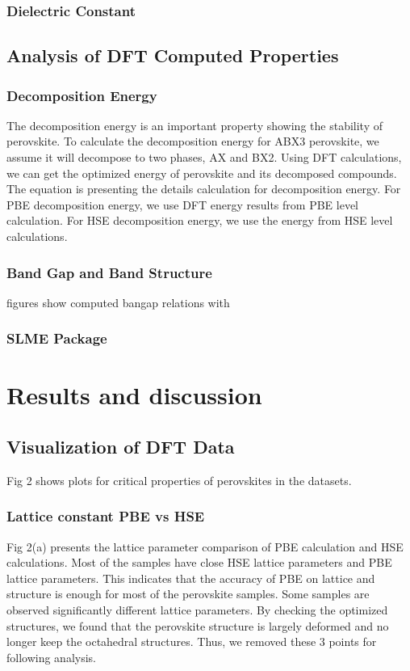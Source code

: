 \documentclass[twoside,twocolumn,9pt]{article}
\begin{document}
    \subsubsection*{Dielectric Constant }

    \subsection*{Analysis of DFT Computed Properties}
    \subsubsection*{Decomposition Energy}
    The decomposition energy is an important property showing the
    stability of perovskite. To calculate the decomposition energy for
    ABX3 perovskite, we assume it will decompose to two phases, AX and
    BX2. Using DFT calculations, we can get the optimized energy of
    perovskite and its decomposed compounds.
    The equation is presenting the details calculation for decomposition
    energy. For PBE decomposition energy, we use DFT energy results from
    PBE level calculation. For HSE decomposition energy, we use the energy
    from HSE level calculations.

    \subsubsection*{Band Gap and Band Structure}
    figures show computed bangap relations with 

    \subsubsection*{SLME Package}

    \newpage




    \section*{Results and discussion}

    \subsection*{Visualization of DFT Data}

    Fig 2 shows plots for critical properties of perovskites in the datasets.

    \subsubsection*{Lattice constant PBE vs HSE}
    Fig 2(a) presents the lattice parameter comparison of PBE calculation
    and HSE calculations. Most of the samples have close HSE lattice
    parameters and PBE lattice parameters. This indicates that the
    accuracy of PBE on lattice and structure is enough for most of the
    perovskite samples. Some samples are observed significantly different
    lattice parameters. By checking the optimized structures, we found
    that the perovskite structure is largely deformed and no longer keep
    the octahedral structures. Thus, we removed these 3 points for
    following analysis.
\end{document}
